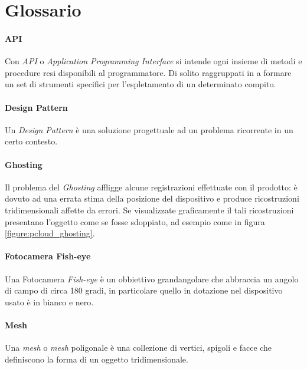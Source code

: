 
\chapter{Glossario}\label{appendix:Glossario}

\subsubsection{API}
Con \emph{API} o \emph{Application Programming Interface} si intende ogni insieme di metodi e procedure resi disponibili al programmatore. Di solito raggruppati in a formare un set di strumenti specifici per l'espletamento di un determinato compito.

\subsubsection{Design Pattern}
Un \emph{Design Pattern} è una soluzione progettuale ad un problema ricorrente in un certo contesto.

\subsubsection{Ghosting}
Il problema del \emph{Ghosting} affligge alcune registrazioni effettuate con il prodotto: è dovuto ad una errata stima della posizione del dispositivo e produce ricostruzioni tridimensionali affette da errori. Se visualizzate graficamente il tali ricostruzioni presentano l'oggetto come se fosse sdoppiato, ad esempio come in figura \ref{figure:pcloud_ghosting}.

\subsubsection{Fotocamera Fish-eye}
Una Fotocamera \emph{Fish-eye} è un obbiettivo grandangolare che abbraccia un angolo di campo di circa 180 gradi, in particolare quello in dotazione nel dispositivo usato è in bianco e nero.

\subsubsection{Mesh}
Una \emph{mesh} o \emph{mesh} poligonale è una collezione di vertici, spigoli e facce che definiscono la forma di un oggetto tridimensionale.

